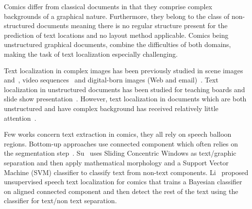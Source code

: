 Comics differ from classical documents in that they comprise complex backgrounds of a graphical nature. Furthermore, they belong to the class of non-structured documents meaning there is no regular structure present for the prediction of text locations and no layout method applicable.
Comics being unstructured graphical documents, combine the difficulties of both domains, making the task of text localization especially challenging.

Text localization in complex images has been previously studied in scene images~\cite{Weinman09,Epshtein10,Neumann12} and~\cite{Wang10,Meng12}, video sequences~\cite{Wonjun09,Shivakumara09} and digital-born images (Web and email)~\cite{Karatzas07}. 
Text localization in unstructured documents has been studied for teaching boards and slide show presentation~\cite{Oliveira10,Nguyen2013BagOfSubjects}.
However, text localization in documents which are both unstructured and have complex background has received relatively little attention~\cite{Clavelli09}.

Few works concern text extraction in comics, they all rely on speech balloon regions.
Bottom-up approaches use connected component which often relies on the segmentation step~\cite{ponsard2012ocr}.
Su~\cite{Su11} uses Sliding Concentric Windows as text/graphic separation and then apply mathematical morphology and a Support Vector Machine (SVM) classifier to classify text from non-text components. 
Li~\cite{Li2013Unsupervised} proposed unsupervised speech text localization for comics that trains a Bayesian classifier on aligned connected component and then detect the rest of the text using the classifier for text/non text separation.
 

